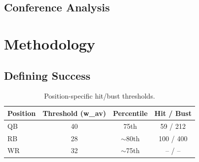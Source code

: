 \documentclass[11pt]{article}
\begin{document}

\subsection{Conference Analysis}



\section{Methodology}


\subsection{Defining Success}


\begin{table}[H]
  \centering
  \begin{tabular}{lccc}
    \toprule
    Position & Threshold (w\_av) & Percentile & Hit / Bust \\
    \midrule
    QB & 40 & 75th & 59 / 212 \\
    RB & 28 & $\sim$80th & 100 / 400 \\
    WR & 32 & $\sim$75th & -- / -- \\
    \bottomrule
  \end{tabular}
  \caption{Position-specific hit/bust thresholds.}
  \label{tab:thresholds}
\end{table}
\end{document}
